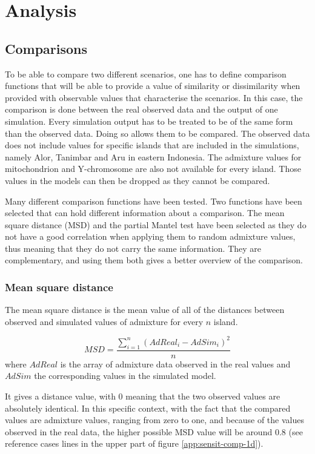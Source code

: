 \documentclass[a4paper,12pt]{report}
\begin{document}
\section{Analysis}
\label{section:analysis}
\subsection{Comparisons}
\label{subsection:comparisons}
To be able to compare two different scenarios, one has to define comparison functions that will be able to provide a value of similarity or dissimilarity when provided with observable values that characterise the scenarios. In this case, the comparison is done between the real observed data and the output of one simulation.
Every simulation output has to be treated to be of the same form than the observed data. Doing so allows them to be compared. The observed data does not include values for specific islands that are included in the simulations, namely Alor, Tanimbar and Aru in eastern Indonesia. The admixture values for mitochondrion and Y-chromosome are also not available for every island.
Those values in the models can then be dropped as they cannot be compared.

Many different comparison functions have been tested. Two functions have been selected that can hold different information about a comparison. The mean square distance (MSD) and the partial Mantel test have been selected as they do not have a good correlation when applying them to random admixture values, thus meaning that they do not carry the same information. They are complementary, and using them both gives a better overview of the comparison.

\subsubsection{Mean square distance}
The mean square distance is the mean value of all of the distances between observed and simulated values of admixture for every $n$ island.

\begin{equation}
MSD = \frac{\sum\limits_{i=1}^{n} (AdReal_i - AdSim_i) ^ 2}{n}
\end{equation}
where $AdReal$ is the array of admixture data observed in the real values and $AdSim$ the corresponding values in the simulated model.

It gives a distance value, with 0 meaning that the two observed values are absolutely identical. In this specific context, with the fact that the compared values are admixture values, ranging from zero to one, and because of the values observed in the real data, the higher possible MSD value will be around $0.8$ (see reference cases lines in the upper part of figure \ref{app:sensit-comp-1d}).
\end{document}
